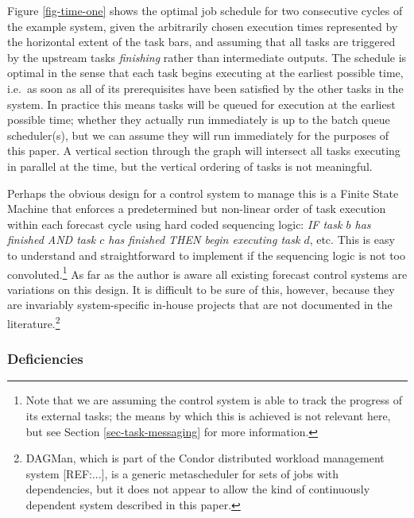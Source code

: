 \documentclass[11pt,a4paper]{article}
\begin{document}
Figure \ref{fig-time-one} shows the optimal job schedule for two
consecutive cycles of the example system, given the arbitrarily chosen
execution times represented by the horizontal extent of the task bars,
and assuming that all tasks are triggered by the upstream tasks {\em
finishing} rather than intermediate outputs.  The schedule is optimal in
the sense that each task begins executing at the earliest possible time,
i.e.\ as soon as all of its prerequisites have been satisfied by the
other tasks in the system. In practice this means tasks will be queued
for execution at the earliest possible time; whether they actually run
immediately is up to the batch queue scheduler(s), but we can assume
they will run immediately for the purposes of this paper. A vertical
section through the graph will intersect all tasks executing in parallel
at the time, but the vertical ordering of tasks is not meaningful.

Perhaps the obvious design for a control system to manage this is a
Finite State Machine that enforces a predetermined but non-linear order
of task execution within each forecast cycle using hard coded sequencing
logic: {\em IF task $b$ has finished AND task $c$ has finished THEN
begin executing task $d$}, etc. This is easy to understand and
straightforward to implement if the sequencing logic is not too
convoluted.\footnote{Note that we are assuming the control system is
able to track the progress of its external tasks; the means by which
this is achieved is not relevant here, but see Section
\ref{sec-task-messaging} for more information.} As far as the author is
aware all existing forecast control systems are variations on this
design. It is difficult to be sure of this, however, because they are
invariably system-specific in-house projects that are not documented in
the literature.\footnote{DAGMan, which is part of the Condor distributed
workload management system [REF:...], is a generic metascheduler for
sets of jobs with dependencies, but it does not appear to allow the kind
of continuously dependent system described in this paper.}

\subsubsection{Deficiencies}
\end{document}

